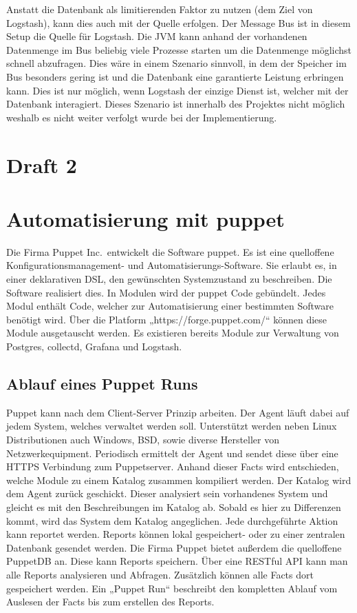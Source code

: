 Anstatt die Datenbank als limitierenden Faktor zu nutzen (dem Ziel von
Logstash), kann dies auch mit der Quelle erfolgen. Der Message Bus ist
in diesem Setup die Quelle für Logstash. Die JVM kann anhand der vorhandenen
Datenmenge im Bus beliebig viele Prozesse starten um die Datenmenge möglichst
schnell abzufragen. Dies wäre in einem Szenario sinnvoll, in dem der Speicher
im Bus besonders gering ist und die Datenbank eine garantierte Leistung
erbringen kann. Dies ist nur möglich, wenn Logstash der einzige Dienst ist,
welcher mit der Datenbank interagiert. Dieses Szenario ist innerhalb des
Projektes nicht möglich weshalb es nicht weiter verfolgt wurde bei der
Implementierung.
\tm%


\section{Draft 2}

\section{Automatisierung mit puppet}
Die Firma Puppet Inc.\ entwickelt die Software puppet. Es ist eine quelloffene
Konfigurationsmanagement- und Automatisierungs-Software. Sie erlaubt es, in
einer deklarativen \gls{DSL}, den gewünschten Systemzustand zu beschreiben.
Die Software realisiert dies. In Modulen wird der puppet Code gebündelt. Jedes
Modul enthält Code, welcher zur Automatisierung einer bestimmten Software
benötigt wird. Über die Platform „https://forge.puppet.com/“ können diese
Module ausgetauscht werden. Es existieren bereits Module zur Verwaltung von
Postgres, collectd, Grafana und Logstash.
\tm%

\subsection{Ablauf eines Puppet Runs}
Puppet kann nach dem \gls{Client-Server} Prinzip arbeiten. Der Agent läuft
dabei auf jedem System, welches verwaltet werden soll. Unterstützt werden neben
Linux Distributionen auch Windows, BSD, sowie diverse Hersteller von
Netzwerkequipment. Periodisch ermittelt der Agent  und
sendet diese über eine \gls{HTTPS} Verbindung zum Puppetserver. Anhand dieser
Facts wird entschieden, welche Module zu einem Katalog zusammen kompiliert
werden. Der Katalog wird dem Agent zurück geschickt. Dieser analysiert sein
vorhandenes System und gleicht es mit den Beschreibungen im Katalog ab. Sobald
es hier zu Differenzen kommt, wird das System dem Katalog angeglichen. Jede
durchgeführte Aktion kann reportet werden. Reports können lokal gespeichert-
oder zu einer zentralen Datenbank gesendet werden. Die Firma Puppet bietet
außerdem die quelloffene PuppetDB an. Diese kann Reports speichern. Über eine
\gls{RESTful} API kann man alle Reports analysieren und Abfragen. Zusätzlich
können alle Facts dort gespeichert werden. Ein „Puppet Run“ beschreibt den
kompletten Ablauf vom Auslesen der Facts bis zum erstellen des Reports.

